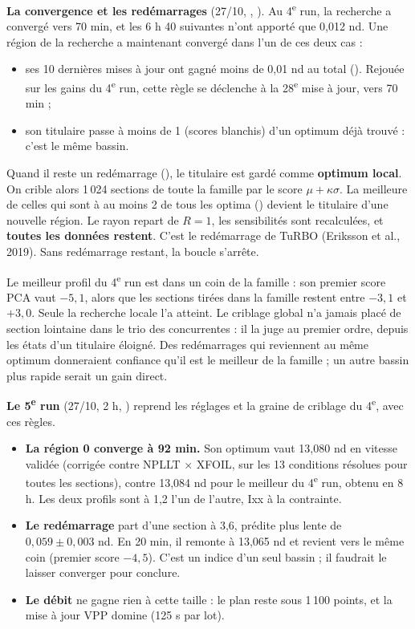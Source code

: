 \documentclass[10pt,a4paper]{article}
\begin{document}
\textbf{La convergence et les redémarrages} (27/10, , ). Au
4\textsuperscript{e} run, la recherche a convergé vers 70 min, et les 6 h 40 suivantes n'ont apporté que
0,012 nd. Une région de la recherche a maintenant convergé dans l'un de ces deux cas :
\begin{itemize}
  \item ses 10 dernières mises à jour ont gagné moins de 0,01 nd au total (). Rejouée
        sur les gains du 4\textsuperscript{e} run, cette règle se déclenche à la 28\textsuperscript{e} mise
        à jour, vers 70 min ;
  \item son titulaire passe à moins de 1 (scores blanchis) d'un optimum déjà trouvé : c'est le même bassin.
\end{itemize}
Quand il reste un redémarrage (), le titulaire est gardé comme \textbf{optimum local}. On crible
alors 1\,024 sections de toute la famille par le score $\mu+\kappa\sigma$. La meilleure de celles qui sont à au
moins 2 de tous les optima () devient le titulaire d'une nouvelle région. Le rayon repart de
$R=1$, les sensibilités sont recalculées, et \textbf{toutes les données restent}. C'est le redémarrage de
TuRBO (Eriksson et al., 2019). Sans redémarrage restant, la boucle s'arrête.

\begin{subtilite}
Le meilleur profil du 4\textsuperscript{e} run est dans un coin de la famille : son premier score PCA vaut
$-5{,}1$, alors que les sections tirées dans la famille restent entre $-3{,}1$ et $+3{,}0$. Seule la recherche
locale l'a atteint. Le criblage global n'a jamais placé de section lointaine dans le trio des concurrentes : il
la juge au premier ordre, depuis les états d'un titulaire éloigné. Des redémarrages qui reviennent au même
optimum donneraient confiance qu'il est le meilleur de la famille ; un autre bassin plus rapide serait un gain
direct.
\end{subtilite}

\textbf{Le 5\textsuperscript{e} run} (27/10, 2 h, ) reprend les
réglages et la graine de criblage du 4\textsuperscript{e}, avec ces règles.
\begin{itemize}
  \item \textbf{La région 0 converge à 92 min.} Son optimum vaut 13,080 nd en vitesse validée (corrigée contre
        NPLLT × XFOIL, sur les 13 conditions résolues pour toutes les sections), contre 13,084 nd pour le meilleur
        du 4\textsuperscript{e} run, obtenu en 8 h. Les deux profils sont à 1,2 l'un de l'autre, Ixx à la contrainte.
  \item \textbf{Le redémarrage} part d'une section à 3,6, prédite plus lente de $0{,}059\pm0{,}003$ nd. En 20 min,
        il remonte à 13,065 nd et revient vers le même coin (premier score $-4{,}5$). C'est un indice d'un seul
        bassin ; il faudrait le laisser converger pour conclure.
  \item \textbf{Le débit} ne gagne rien à cette taille : le plan reste sous 1\,100 points, et la mise à jour VPP
        domine (125 s par lot).
\end{itemize}
\end{document}
